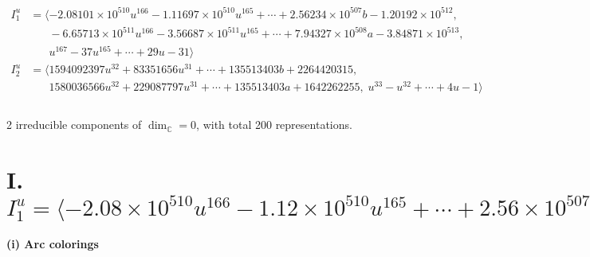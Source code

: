 \documentclass[1p]{elsarticle_modified}
\theoremstyle{definition}
\begin{document}
\begin{align*}
I^u_{1}&=\langle 
-2.08101\times10^{510} u^{166}-1.11697\times10^{510} u^{165}+\cdots+2.56234\times10^{507} b-1.20192\times10^{512},\\
\phantom{I^u_{1}}&\phantom{= \langle  }-6.65713\times10^{511} u^{166}-3.56687\times10^{511} u^{165}+\cdots+7.94327\times10^{508} a-3.84871\times10^{513},\\
\phantom{I^u_{1}}&\phantom{= \langle  }u^{167}-37 u^{165}+\cdots+29 u-31\rangle \\
I^u_{2}&=\langle 
1594092397 u^{32}+83351656 u^{31}+\cdots+135513403 b+2264420315,\\
\phantom{I^u_{2}}&\phantom{= \langle  }1580036566 u^{32}+229087797 u^{31}+\cdots+135513403 a+1642262255,\;u^{33}- u^{32}+\cdots+4 u-1\rangle \\
\\
\end{align*}
\raggedright * 2 irreducible components of $\dim_{\mathbb{C}}=0$, with total 200 representations.\\
\newpage
\renewcommand{\arraystretch}{1}
\centering \section*{I. $I^u_{1}= \langle -2.08\times10^{510} u^{166}-1.12\times10^{510} u^{165}+\cdots+2.56\times10^{507} b-1.20\times10^{512},\;-6.66\times10^{511} u^{166}-3.57\times10^{511} u^{165}+\cdots+7.94\times10^{508} a-3.85\times10^{513},\;u^{167}-37 u^{165}+\cdots+29 u-31 \rangle$}
\flushleft \textbf{(i) Arc colorings}\\
\end{document}
